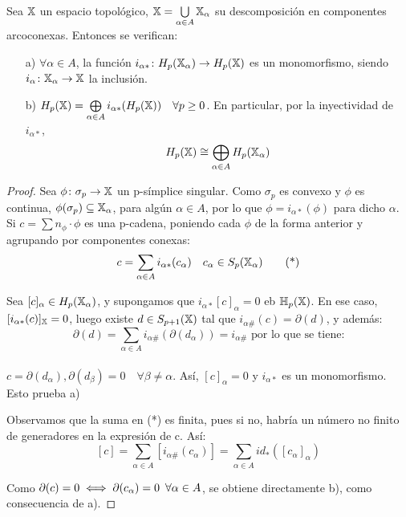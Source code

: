 \begin{proposition}
  Sea ${\mathbb X}$ un espacio topológico, ${\mathbb X} = \bigcup\limits_{\alpha \in A} {\mathbb X}_\alpha$ su descomposición en componentes arcoconexas. Entonces se verifican:
  \begin{itemize}
    \item[a)] $\forall \alpha \in A$, la función $i_{\alpha*} \colon H_p({\mathbb X}_\alpha) \to H_p({\mathbb X})$ es un monomorfismo, siendo
              $i_\alpha \colon {\mathbb X}_\alpha \to {\mathbb X}$ la inclusión.
    \item[b)] $H_p({\mathbb X}) = \bigoplus\limits_{\alpha \in A} i_{\alpha*}(H_p({\mathbb X})) \quad \forall p \geq 0$. En particular, por la inyectividad de $i_{\alpha*}$,
              \[ H_p({\mathbb X}) \cong \bigoplus_{\alpha \in A} H_p({\mathbb X}_\alpha) \]
  \end{itemize}
\end{proposition}

\begin{proof}
  Sea $\phi \colon \sigma_p \to {\mathbb X}$ un p-símplice singular. Como $\sigma_p$ es convexo y $\phi$ es continua, $\phi(\sigma_p) \subseteq {\mathbb X}_\alpha$, para algún
  $\alpha \in A$, por lo que $\phi = i_{\alpha*}(\phi)$ para dicho $\alpha$. \\
  Si $c = \sum n_\phi \cdot \phi$ es una p-cadena, poniendo cada $\phi$ de la forma anterior y agrupando por componentes conexas:
  \begin{equation}\label{eq1}
    c = \sum\limits_{\alpha \in A} i_{\alpha*}(c_\alpha) \quad c_\alpha \in S_p({\mathbb X}_\alpha)  \tag{*}
  \end{equation}

  Sea $[c]_\alpha \in H_p({\mathbb X}_\alpha)$, y supongamos que $i_{\alpha*}[c]_\alpha = 0$ eb ${\mathbb H}_p({\mathbb X})$. En ese caso, $[i_{\alpha*}(c)]_{\mathbb X} = 0$,
  luego existe $d \in S_{p+1}({\mathbb X})$ tal que $i_{\alpha\#}(c) = \partial(d)$, y además: \\
  \[\partial(d) = \sum\limits_{\alpha \in A} i_{\alpha\#}(\partial(d_\alpha)) = i_{\alpha\#} \text{ por lo que se tiene:} \]\\
  $c = \partial(d_\alpha), \partial(d_\beta) = 0 \quad \forall \beta \neq \alpha$. Así, $[c]_\alpha = 0$ y $i_{\alpha*}$ es un monomorfismo.
  Esto prueba a)

  Observamos que la suma en (*) es finita, pues si no, habría un número no finito de generadores en la expresión de c. Así:
  \[  [c] = \sum\limits_{\alpha \in A} [i_{\alpha\#}(c_\alpha)] =  \sum\limits_{\alpha \in A} id_*([c_\alpha]_\alpha)\]

  Como $\partial(c) = 0 \iff \partial(c_\alpha) = 0 \hspace{0.5em} \forall \alpha \in A$, se obtiene directamente b), como consecuencia de a).

\end{proof}

